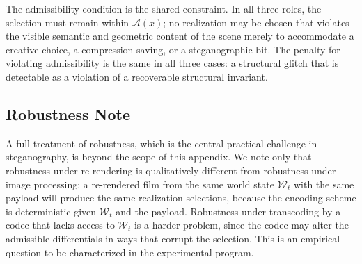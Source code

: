 \documentclass[11pt,a4paper]{article}
\theoremstyle{plain}
\theoremstyle{definition}
\theoremstyle{remark}
\begin{document}
The admissibility condition is the shared constraint. In all three roles, the selection must remain within $\mathcal{A}(x)$; no realization may be chosen that violates the visible semantic and geometric content of the scene merely to accommodate a creative choice, a compression saving, or a steganographic bit. The penalty for violating admissibility is the same in all three cases: a structural glitch that is detectable as a violation of a recoverable structural invariant.

\subsection{Robustness Note}

A full treatment of robustness, which is the central practical challenge in steganography, is beyond the scope of this appendix. We note only that robustness under re-rendering is qualitatively different from robustness under image processing: a re-rendered film from the same world state $\mathcal{W}_t$ with the same payload will produce the same realization selections, because the encoding scheme is deterministic given $\mathcal{W}_t$ and the payload. Robustness under transcoding by a codec that lacks access to $\mathcal{W}_t$ is a harder problem, since the codec may alter the admissible differentials in ways that corrupt the selection. This is an empirical question to be characterized in the experimental program.
\end{document}
